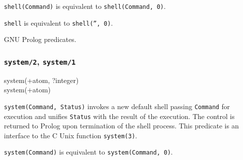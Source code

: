 \texttt{shell(Command)} is equivalent to \texttt{shell(Command, 0)}.

\texttt{shell} is equivalent to \texttt{shell('', 0)}.

\begin{PlErrors}




\end{PlErrors}

\Portability

GNU Prolog predicates.

\subsubsection{\texttt{system/2},
               \texttt{system/1}}

\begin{TemplatesOneCol}
system(+atom, ?integer)\\
system(+atom)

\end{TemplatesOneCol}

\Description

\texttt{system(Command, Status)} invokes a new default shell passing
\texttt{Command} for execution and unifies \texttt{Status} with the result
of the execution. The control is returned to Prolog upon termination of the
shell process. This predicate is an interface to the C Unix function
\texttt{system(3)}.

\texttt{system(Command)} is equivalent to \texttt{system(Command, 0)}.

\begin{PlErrors}




\end{PlErrors}

